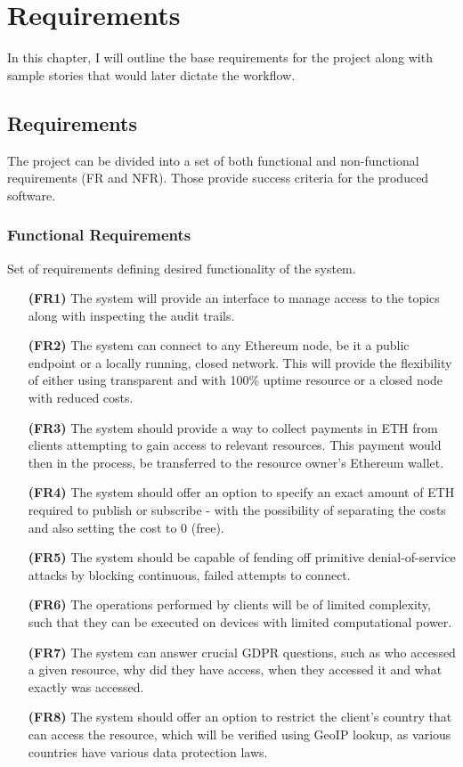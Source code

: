 \chapter{Requirements}
In this chapter, I will outline the base requirements for the project along with sample stories that would later dictate the workflow.

\section{Requirements}

The project can be divided into a set of both functional and non-functional requirements (FR and NFR). Those provide success criteria for the  produced software.

\subsection{Functional Requirements}
Set of requirements defining desired functionality of the system.

\begin{itemize}[leftmargin=4.5em]
\item[\textbf{(FR1)}] The system will provide an interface to manage access to the topics along with inspecting the audit trails.
\item[\textbf{(FR2)}] The system can connect to any Ethereum node, be it a public endpoint or a locally running, closed network. This will provide the flexibility of either using transparent and with 100\% uptime resource or a closed node with reduced costs.
\item[\textbf{(FR3)}] The system should provide a way to collect payments in ETH from clients attempting to gain access to relevant resources. This payment would then in the process, be transferred to the resource owner's Ethereum wallet.
\item[\textbf{(FR4)}] The system should offer an option to specify an exact amount of ETH required to publish or subscribe - with the possibility of separating the costs and also setting the cost to 0 (free).
\item[\textbf{(FR5)}] The system should be capable of fending off primitive denial-of-service attacks by blocking continuous, failed attempts to connect.
\item[\textbf{(FR6)}] The operations performed by clients will be of limited complexity, such that they can be executed on devices with limited computational power.
\item[\textbf{(FR7)}] The system can answer crucial GDPR questions, such as who accessed a given resource, why did they have access, when they accessed it and what exactly was accessed.
\item[\textbf{(FR8)}] The system should offer an option to restrict the client's country that can access the resource, which will be verified using GeoIP lookup, as various countries have various data protection laws.
\end{itemize}

